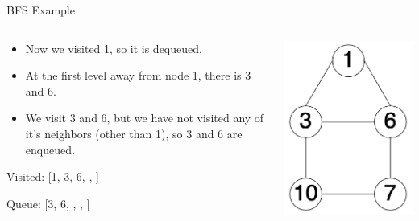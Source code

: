 \documentclass[
  ignorenonframetext,
]{beamer}
\begin{document}
\begin{frame}{BFS Example}
\protect\hypertarget{bfs-example-2}{}
\begin{columns}[T]
\begin{column}{0.6\textwidth}
\begin{itemize}
\item
  Now we visited 1, so it is dequeued.
\item
  At the first level away from node 1, there is 3 and 6.
\item
  We visit 3 and 6, but we have not visited any of it's neighbors (other
  than 1), so 3 and 6 are enqueued. \vspace{1cm}
\end{itemize}

Visited: {[}1, 3, 6, , {]}

Queue: {[}3, 6, , , {]}
\end{column}

\begin{column}{0.4\textwidth}
\includegraphics{images/graph-bfs.png}
\end{column}
\end{columns}
\end{frame}
\end{document}
